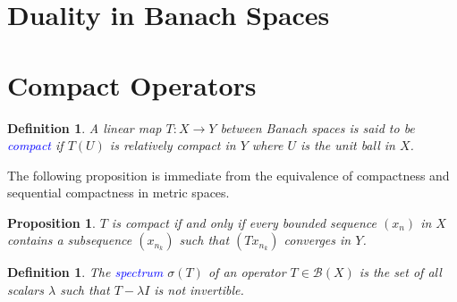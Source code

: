 \documentclass[12pt]{article}
\theoremstyle{thmstyle}
\newtheorem{proposition}[theorem]{Proposition}
\theoremstyle{defstyle}
\newtheorem{definition}[theorem]{Definition}
\newcommand{\scrB}{\mathscr B}
\newcommand{\define}[1]{\textcolor{blue}{\textit{#1}}}
\begin{document}
\section{Duality in Banach Spaces}



\section{Compact Operators}

\begin{definition}
    A linear map $T: X\to Y$ between Banach spaces is said to be \define{compact} if $T(U)$ is relatively compact in $Y$ where $U$ is the unit ball in $X$.
\end{definition}

The following proposition is immediate from the equivalence of compactness and sequential compactness in metric spaces.

\begin{proposition}
    $T$ is compact if and only if every bounded sequence $(x_n)$ in $X$ contains a subsequence $(x_{n_k})$ such that $(Tx_{n_k})$ converges in $Y$.
\end{proposition}

\begin{definition}
    The \define{spectrum} $\sigma(T)$ of an operator $T\in\scrB(X)$ is the set of all scalars $\lambda$ such that $T - \lambda I$ is not invertible.
\end{definition}
\end{document}
